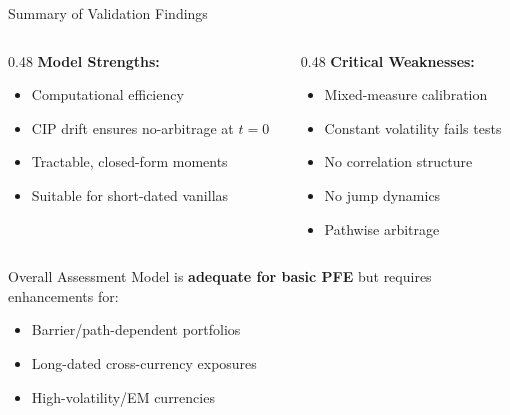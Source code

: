 \documentclass[11pt,aspectratio=169]{beamer}
\begin{document}
	
	\begin{frame}{Summary of Validation Findings}
		\begin{columns}[T]
			\begin{column}{0.48\textwidth}
				\textbf{Model Strengths:}
				\begin{itemize}
					\item[\textcolor{green!60!black}{$\checkmark$}] Computational efficiency
					\item[\textcolor{green!60!black}{$\checkmark$}] CIP drift ensures no-arbitrage at $t=0$
					\item[\textcolor{green!60!black}{$\checkmark$}] Tractable, closed-form moments
					\item[\textcolor{green!60!black}{$\checkmark$}] Suitable for short-dated vanillas
				\end{itemize}
			\end{column}
			
			\begin{column}{0.48\textwidth}
				\textbf{Critical Weaknesses:}
				\begin{itemize}
					\item[\textcolor{mufgred}{$\times$}] Mixed-measure calibration
					\item[\textcolor{mufgred}{$\times$}] Constant volatility fails tests
					\item[\textcolor{mufgred}{$\times$}] No correlation structure
					\item[\textcolor{mufgred}{$\times$}] No jump dynamics
					\item[\textcolor{mufgred}{$\times$}] Pathwise arbitrage
				\end{itemize}
			\end{column}
		\end{columns}
		
		\vspace{0.3cm}
		
		\begin{alertblock}{Overall Assessment}
			Model is \textbf{adequate for basic PFE} but requires enhancements for:
			\begin{itemize}
				\item Barrier/path-dependent portfolios
				\item Long-dated cross-currency exposures
				\item High-volatility/EM currencies
			\end{itemize}
		\end{alertblock}
	\end{frame}
	
\end{document}
